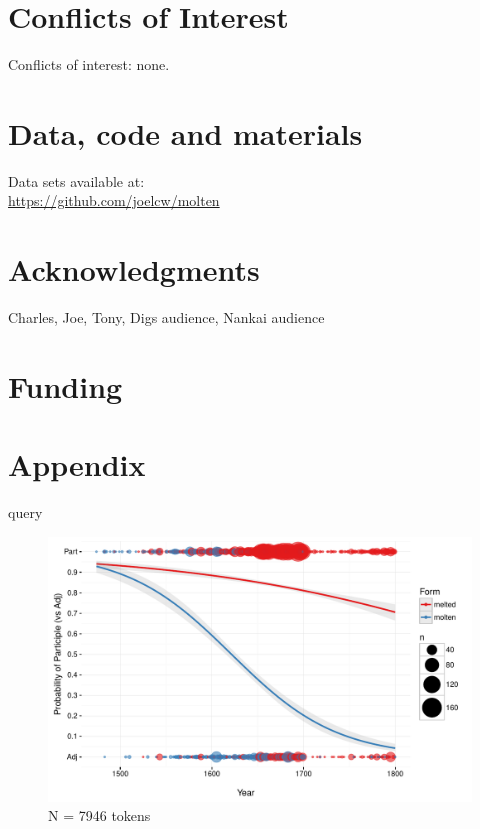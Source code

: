 \documentclass{artikel3}
\begin{document}
\section*{Conflicts of Interest}

Conflicts of interest: none.

\section*{Data, code and materials}

Data sets available at: \\
\url{https://github.com/joelcw/molten}\\


\section*{Acknowledgments}

Charles, Joe, Tony, Digs audience, Nankai audience


\section*{Funding}

\section*{Appendix}
query



%

%
  

\pagebreak 

\begin{figure}
    \begin{center}
    \includegraphics[scale=.6]{ContextByDateUnbinnedWithDots2.pdf}
    \caption{N =  7946 tokens}
       \label{molten1}
    \end{center}
\end{figure}
\end{document}

